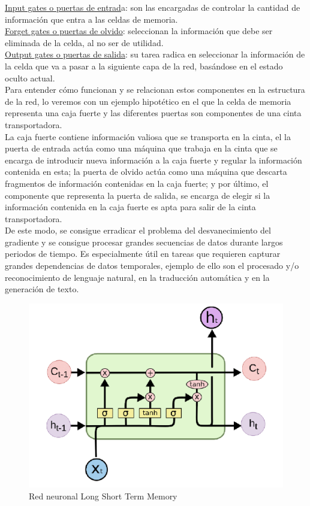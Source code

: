 \underline{Input gates o puertas de entrad}a: son las encargadas de controlar la cantidad de información que entra a las celdas de memoria.\\

\underline{Forget gates o puertas de olvido}: seleccionan la información que debe ser eliminada de la celda, al no ser de utilidad.\\

\underline{Output gates o puertas de salida}: su tarea radica en seleccionar la información de la celda que va a pasar a la siguiente capa de la red, basándose en el estado oculto actual.\\

Para entender cómo funcionan y se relacionan estos componentes en la estructura de la red, lo veremos con un ejemplo hipotético en el que la celda de memoria representa una caja fuerte y las diferentes puertas son componentes de una cinta transportadora. \\

La caja fuerte contiene información valiosa que se transporta en la cinta, el la puerta de entrada actúa como una máquina que trabaja en la cinta que se encarga de introducir nueva información a la caja fuerte y regular la información contenida en esta; la puerta de olvido actúa como una máquina que descarta fragmentos de información contenidas en la caja fuerte; y por último, el componente que representa la puerta de salida, se encarga de elegir si la información contenida en la caja fuerte es apta para salir de la cinta transportadora. \\

De este modo, se consigue erradicar el problema del desvanecimiento del gradiente y se consigue procesar grandes secuencias de datos durante largos periodos de tiempo. Es especialmente útil en tareas que requieren capturar grandes dependencias de datos temporales, ejemplo de ello son el procesado y/o reconocimiento de lenguaje natural, en la traducción automática y en la generación de texto.\\

\begin{figure}[h]
	\centering
	\includegraphics[width = 1 \textwidth]{Imagenes/Vectorial/lstm.png}
	\caption{Red neuronal Long Short Term Memory}
	\label{fig:lstm}
\end{figure}



